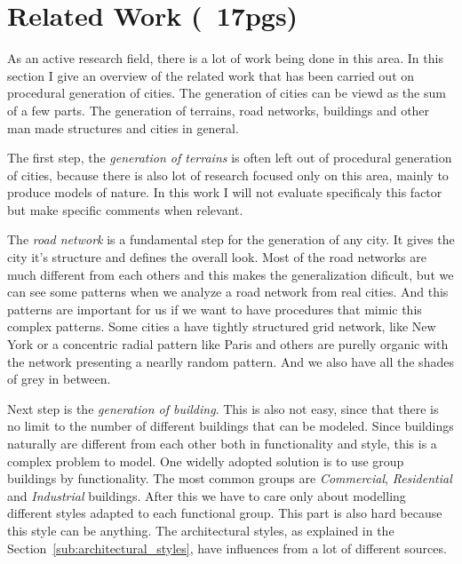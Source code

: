 
% 
% 


\section{Related Work (~17pgs)}
\label{sec:related_work}
%

As an active research field, there is a lot of work being done in this area. In this section I give an overview of the related work that has been carried out on procedural generation of cities. The generation of cities can be viewd as the sum of a few parts. The generation of terrains, road networks, buildings and other man made structures and cities in general.

The first step, the \emph{generation of terrains} is often left out of procedural generation of cities, because there is also lot of research focused only on this area, mainly to produce models of nature. In this work I will not evaluate specificaly this factor but make specific comments when relevant.

The \emph{road network} is a fundamental step for the generation of any city. It gives the city it's structure and defines the overall look. Most of the road networks are much different from each others and this makes the generalization dificult, but we can see some patterns when we analyze a road network from real cities. And this patterns are important for us if we want to have procedures that mimic this complex patterns. Some cities a have tightly structured grid network, like New York or a concentric radial pattern like Paris and others are purelly organic with the network presenting a nearlly random pattern. And we also have all the shades of grey in between.

Next step is the \emph{generation of building}. This is also not easy, since that there is no limit to the number of different buildings that can be modeled. Since buildings naturally are different from each other both in functionality and style, this is a complex problem to model. One widelly adopted solution is to use group buildings by functionality. The most common groups are \emph{Commercial}, \emph{Residential} and \emph{Industrial} buildings. After this we have to care only about modelling different styles adapted to each functional group. This part is also hard because this style can be anything. The architectural styles, as explained in the Section~\ref{sub:architectural_styles}, have influences from a lot of different sources. 

